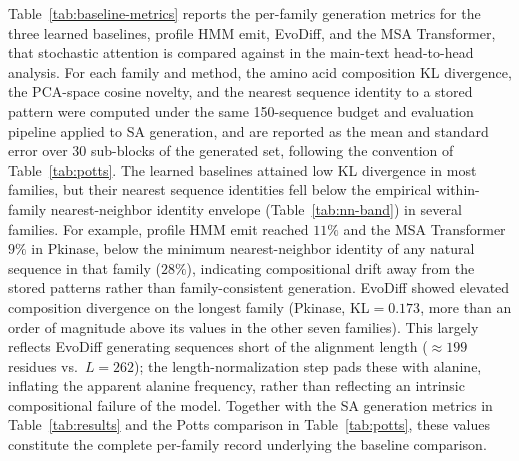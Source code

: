 \documentclass[10pt]{article}
\begin{document}
Table~\ref{tab:baseline-metrics} reports the per-family generation metrics for the three learned baselines, profile HMM emit, EvoDiff, and the MSA Transformer, that stochastic attention is compared against in the main-text head-to-head analysis. For each family and method, the amino acid composition KL divergence, the PCA-space cosine novelty, and the nearest sequence identity to a stored pattern were computed under the same 150-sequence budget and evaluation pipeline applied to SA generation, and are reported as the mean and standard error over 30 sub-blocks of the generated set, following the convention of Table~\ref{tab:potts}. The learned baselines attained low KL divergence in most families, but their nearest sequence identities fell below the empirical within-family nearest-neighbor identity envelope (Table~\ref{tab:nn-band}) in several families. For example, profile HMM emit reached $11\%$ and the MSA Transformer $9\%$ in Pkinase, below the minimum nearest-neighbor identity of any natural sequence in that family ($28\%$), indicating compositional drift away from the stored patterns rather than family-consistent generation. EvoDiff showed elevated composition divergence on the longest family (Pkinase, KL${=}0.173$, more than an order of magnitude above its values in the other seven families). This largely reflects EvoDiff generating sequences short of the alignment length (${\approx}199$ residues vs.\ $L{=}262$); the length-normalization step pads these with alanine, inflating the apparent alanine frequency, rather than reflecting an intrinsic compositional failure of the model. Together with the SA generation metrics in Table~\ref{tab:results} and the Potts comparison in Table~\ref{tab:potts}, these values constitute the complete per-family record underlying the baseline comparison.
\end{document}
